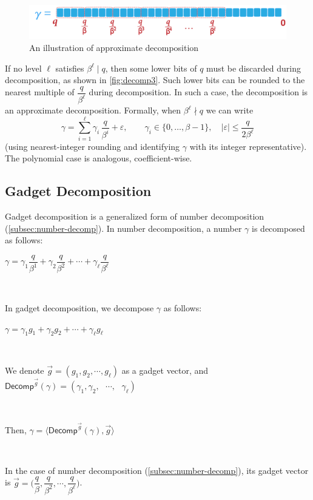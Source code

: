 \begin{figure}[h!]
    \centering
  \includegraphics[width=0.7\linewidth]{figures/decomp3.pdf}
  \caption{An illustration of approximate decomposition}
  \label{fig:decomp3}
\end{figure}

If no level $\ell$ satisfies $\beta^\ell \mid q$, then some lower bits of $q$ must be discarded during decomposition, as shown in \autoref{fig:decomp3}. Such lower bits can be rounded to the nearest multiple of $\dfrac{q}{\beta^\ell}$ during decomposition. In such a case, the decomposition is an approximate decomposition. 
Formally, when $\beta^\ell\nmid q$ we can write
$$
\gamma=\sum_{i=1}^{\ell}\gamma_i\,\frac{q}{\beta^{i}}+\varepsilon,\qquad
\gamma_i\in\{0,\ldots,\beta-1\},\quad
|\varepsilon|\le \frac{q}{2\beta^{\ell}}
$$
(using nearest-integer rounding and identifying $\gamma$ with its integer representative). The polynomial case is analogous, coefficient-wise.



\subsection{Gadget Decomposition}
\label{subsec:gadget-decomposition}

Gadget decomposition is a generalized form of number decomposition (\autoref{subsec:number-decomp}). In number decomposition, a number $\gamma$ is decomposed as follows: 

$\gamma = \gamma_1 \dfrac{q}{\beta^1} + \gamma_2 \dfrac{q}{\beta^2} + \cdots + \gamma_\ell \dfrac{q}{\beta^\ell} $

$ $

In gadget decomposition, we decompose $\gamma$ as follows: 

$\gamma = \gamma_1 g_1 + \gamma_2 g_2 + \cdots + \gamma_\ell g_\ell $

$ $

We denote $\vec{g} = (g_1, g_2, \cdots, g_\ell)$ as a gadget vector, and $\textsf{Decomp}^{\vec{g}}(\gamma) = (\gamma_1, \gamma_2, \text{ } \cdots , \text{ } \gamma_\ell) $

$ $

Then, $\gamma = \langle \textsf{Decomp}^{\vec{g}}(\gamma), \vec{g} \rangle $

$ $

In the case of number decomposition (\autoref{subsec:number-decomp}), its gadget vector is $\vec{g} = \Bigg(\dfrac{q}{\beta}, \dfrac{q}{\beta^2}, \cdots, \dfrac{q}{\beta^\ell}\Bigg)$.